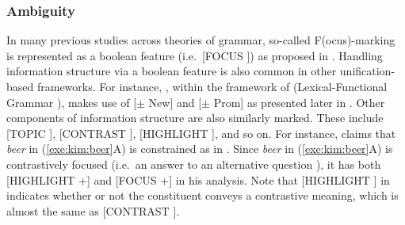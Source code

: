\subsubsection{Ambiguity}
\label{8:ssec:hpsg:boolean}


In many previous studies across theories of grammar, so-called
F(ocus)-marking is represented as a boolean feature (i.e.\ [FOCUS
  ]) as proposed in \citet{zubizarreta:98}.  Handling
information structure via a boolean feature is also common in other
unification-based frameworks. For instance, \citet{choi:99}, within
the framework of  (Lexical-Functional Grammar
\citealt{bresnan:01}), makes use of [\ensuremath{\pm} New] and
[\ensuremath{\pm} Prom] as presented later in .  Other
components of information structure are also similarly marked.  These
include [TOPIC ], [CONTRAST ], [HIGHLIGHT
  ], and so on. For instance, \citet{kim:07} claims that
\textit{beer} in (\ref{exe:kim:beer}A) is constrained as in
. Since \textit{beer} in (\ref{exe:kim:beer}A)
is contrastively focused (i.e.\ an answer to an alternative question
\citealt{gryllia:09}), it has both [HIGHLIGHT +]
and [FOCUS +] in his analysis. Note that [HIGHLIGHT ] in
 indicates whether or not the constituent conveys
a contrastive meaning, which is almost the same as [CONTRAST
  ].





